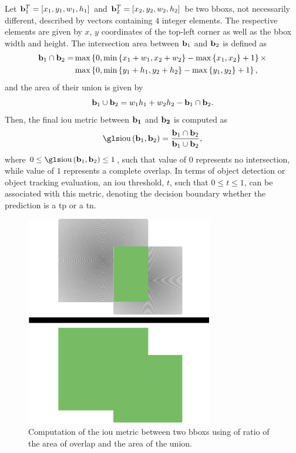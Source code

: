 Let ${\mathbf{b}}_{1}^{T} = \left[ {x_1, y_1, w_1, h_1} \right]$ and ${\mathbf{b}}_{2}^{T} = \left[ {x_2, y_2, w_2, h_2} \right]$ be two \glspl{bbox}, not necessarily different, described by vectors containing $4$ integer elements. The respective elements are given by $x$, $y$ coordinates of the top-left corner as well as the \gls{bbox} width and height. The intersection area between $\mathbf{b}_1$ and $\mathbf{b}_2$ is defined as
\begin{equation}
\begin{aligned}
    \mathbf{b}_1 \cap \mathbf{b}_2 =
    &\max \left\{ {0,
                    \min \left\{ {x_1 + w_1, x_2 + w_2} \right\} - \max \left\{ {x_1, x_2} \right\} + 1} \right\}
    \times\\
    &\max \left\{ {0,
                    \min \left\{ {y_1 + h_1, y_2 + h_2} \right\} - \max \left\{ {y_1, y_2} \right\} + 1} \right\},
\end{aligned}
\end{equation}
and the area of their union is given by
\begin{equation}
    \mathbf{b}_1 \cup \mathbf{b}_2 = w_1 h_1 + w_2 h_2 - \mathbf{b}_1 \cap \mathbf{b}_2.
\end{equation}
Then, the final \gls{iou} metric between $\mathbf{b_1}$ and $\mathbf{b_2}$ is computed as
\begin{equation}
    \label{eq:IntersectionOverUnion}
    \func{\IOU}{\vect{b}_1, \vect{b}_2} =
    \frac{\vect{b}_1 \cap \vect{b}_2}{\vect{b}_1 \cup \vect{b}_2},
\end{equation}
where $0 \leq \func{\IOU}{\vect{b}_1, \vect{b}_2} \leq 1$, such that value of $0$ represents no intersection, while value of $1$ represents a complete overlap. In terms of object detection or object tracking evaluation, an \gls{iou} threshold, $t$, such that $0 \leq t \leq 1$, can be associated with this metric, denoting the decision boundary whether the prediction is a \gls{tp} or a \gls{tn}.

\begin{figure}[t]
    \centerline{\includegraphics[width=0.25\linewidth]{figures/theoretical_foundations/intersection_over_union.pdf}}
    \caption[\Gls{iou} visualization]{Computation of the \gls{iou} metric between two \glspl{bbox} using of ratio of the area of overlap and the area of the union.}
    \label{fig:IntersectionOverUnion}
\end{figure}

